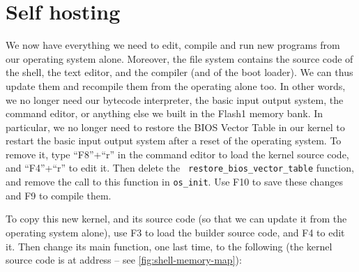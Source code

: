 
\section{Self hosting}

We now have everything we need to edit, compile and run new programs from our
operating system alone. Moreover, the file system contains the source code of
the shell, the text editor, and the compiler (and of the boot loader). We can
thus update them and recompile them from the operating alone too. In other
words, we no longer need our bytecode interpreter, the basic input output
system, the command editor, or anything else we built in the Flash1 memory
bank. In particular, we no longer need to restore the BIOS Vector Table in our
kernel to restart the basic input output system after a reset of the operating
system. To remove it, type ``F8''+``r'' in the command editor to load the
kernel source code, and ``F4''+``r'' to edit it. Then delete the {\tt
restore\_bios\_vector\_table} function, and remove the call to this function in
{\tt os\_init}. Use F10 to save these changes and F9 to compile them.


To copy this new kernel, and its source code (so that we can update it from the
operating system alone), use F3 to load the builder source code,
and F4 to edit it. Then change its main function, one last time, to the
following (the kernel source code is at address  --
see \cref{fig:shell-memory-map}):

